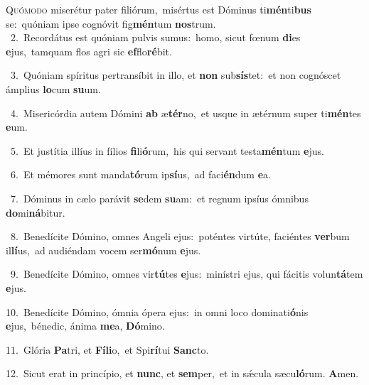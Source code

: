 \lettrine{\initial\textcolor{\initialcolor}{Q}}{uómodo} miserétur pater filiórum,~\dagger misértus est Dóminus ti\-\textbf{mén}\-ti\textbf{bus} se:~\star quóniam ipse cognóvit fig\-\textbf{mén}\-tum \textbf{nos}\-trum.\\
{\numbfont\textcolor{\numbcolor}{~2.}}~Recordátus est quóniam pulvis sumus:~\dagger homo, sicut fœnum \textbf{di}\-es \textbf{e}\-jus,~\star tamquam flos agri sic \textbf{ef}\-flo\-\textbf{ré}\-bit.\par
{\numbfont\textcolor{\numbcolor}{~3.}}~Quóniam spíritus pertransíbit in illo, et \textbf{non} sub\-\textbf{sís}\-tet:~\star et non cognóscet ámplius \textbf{lo}\-cum \textbf{su}\-um.\par
{\numbfont\textcolor{\numbcolor}{~4.}}~Misericórdia autem Dómini \textbf{ab} æ\-\textbf{tér}\-no,~\star et usque in ætérnum super ti\-\textbf{mén}\-tes \textbf{e}\-um.\par
{\numbfont\textcolor{\numbcolor}{~5.}}~Et justítia illíus in fílios \textbf{fi}\-li\-\textbf{ó}\-rum,~\star his qui servant testa\-\textbf{mén}\-tum \textbf{e}\-jus.\par
{\numbfont\textcolor{\numbcolor}{~6.}}~Et mémores sunt manda\-\textbf{tó}\-rum ip\-\textbf{sí}\-us,~\star ad faci\-\textbf{én}\-dum \textbf{e}\-a.\par
{\numbfont\textcolor{\numbcolor}{~7.}}~Dóminus in cælo parávit \textbf{se}\-dem \textbf{su}\-am:~\star et regnum ipsíus ómnibus \textbf{do}\-mi\-\textbf{ná}\-bitur.\par
{\numbfont\textcolor{\numbcolor}{~8.}}~Benedícite Dómino, omnes Angeli ejus:~\dagger poténtes virtúte, faciéntes \textbf{ver}\-bum il\-\textbf{lí}\-us,~\star ad audiéndam vocem ser\-\textbf{mó}\-num \textbf{e}\-jus.\par
{\numbfont\textcolor{\numbcolor}{~9.}}~Benedícite Dómino, omnes vir\-\textbf{tú}\-tes \textbf{e}\-jus:~\star minístri ejus, qui fácitis volun\-\textbf{tá}\-tem \textbf{e}\-jus.\par
{\numbfont\textcolor{\numbcolor}{10.}}~Benedícite Dómino, ómnia ópera ejus:~\dagger in omni loco dominati\-\textbf{ó}\-nis \textbf{e}\-jus,~\star bénedic, ánima \textbf{me}\-a, \textbf{Dó}\-mino.\par
{\numbfont\textcolor{\numbcolor}{11.}}~Glória \textbf{Pa}\-tri, et \textbf{Fí}\-\textbf{li}o,~\star et Spi\-\textbf{rí}\-tui \textbf{Sanc}\-to.\par
{\numbfont\textcolor{\numbcolor}{12.}}~Sicut erat in princípio, et \textbf{nunc}\-, et \textbf{sem}\-per,~\star et in sǽcula sæcu\-\textbf{ló}\-rum. \textbf{A}\-men.\par
